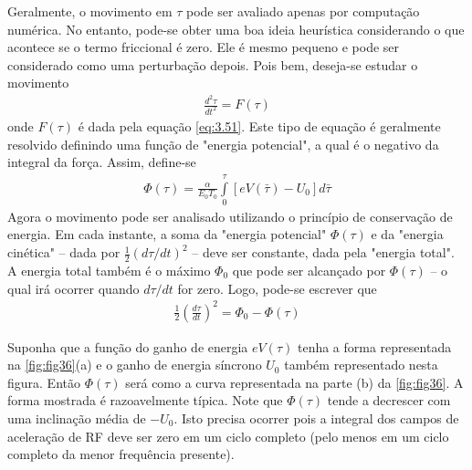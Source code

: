 Geralmente, o movimento em $\tau$ pode ser avaliado apenas por computação numérica. No entanto, pode-se obter uma boa ideia heurística considerando o que acontece se o termo friccional é zero. Ele é mesmo pequeno e pode ser considerado como uma perturbação depois. Pois bem, deseja-se estudar o movimento
\begin{align}
	\frac{d^2\tau}{dt^2} = F(\tau)
\end{align}
onde $F(\tau)$ é dada pela equação \eqref{eq:3.51}. Este tipo de equação é geralmente resolvido definindo uma função de "energia potencial", a qual é o negativo da integral da força. Assim, define-se
\begin{align}
	\Phi(\tau) = \frac{\alpha}{E_0 T_0} \int\limits_{0}^{\tau}[eV(\bar{\tau}) - U_0]d\bar{\tau}
\end{align}
Agora o movimento pode ser analisado utilizando o princípio de conservação de energia. Em cada instante, a soma da "energia potencial" $\Phi(\tau)$ e da "energia cinética" -- dada por $\frac{1}{2}(d\tau/dt)^2$ -- deve ser constante, dada pela "energia total". A energia total também é o máximo $\Phi_0$ que pode ser alcançado por $\Phi(\tau)$ -- o qual irá ocorrer quando $d\tau/dt$ for zero. Logo, pode-se escrever que
\begin{align}
	\frac{1}{2}\left(\frac{d\tau}{dt}\right)^2 = \Phi_0 - \Phi(\tau)\label{eq:3.54}
\end{align}

Suponha que a função do ganho de energia $eV(\tau)$ tenha a forma representada na \autoref{fig:fig36}(a) e o ganho de energia síncrono $U_0$ também representado nesta figura. Então $\Phi(\tau)$ será como a curva representada na parte (b) da \autoref{fig:fig36}. A forma mostrada é razoavelmente típica. Note que $\Phi(\tau)$ tende a decrescer com uma inclinação média de $-U_0$. Isto precisa ocorrer pois a integral dos campos de aceleração de RF deve ser zero em um ciclo completo (pelo menos em um ciclo completo da menor frequência presente).

